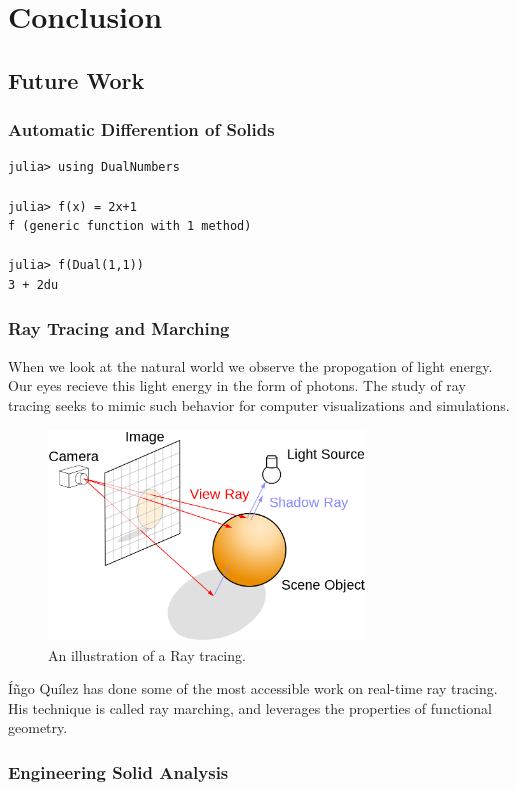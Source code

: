\chapter{Conclusion}

\section{Future Work}

\subsection{Automatic Differention of Solids}

\begin{lstlisting}
julia> using DualNumbers

julia> f(x) = 2x+1
f (generic function with 1 method)

julia> f(Dual(1,1))
3 + 2du
\end{lstlisting}



\subsection{Ray Tracing and Marching}


When we look at the natural world we observe the
propogation of light energy. Our eyes recieve this light energy in the form
of photons. The study of ray tracing seeks to mimic such behavior for
computer visualizations and simulations. 

\begin{figure}[h!]
  \centering
    \includegraphics[width=0.75\textwidth]{img/ray_trace_diagram.png}
  \caption{An illustration of a Ray tracing.\protect\footnotemark}
  \label{fig:raytrace}
\end{figure}


Íñgo Quílez has done some of the most accessible work on real-time ray tracing.
His technique is called ray marching, and leverages the properties of functional
geometry.\cite{Quilez_2008}

\subsection{Engineering Solid Analysis}



